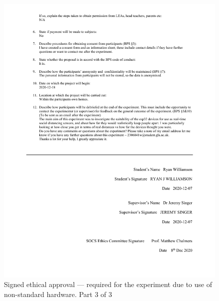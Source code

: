 \documentclass{l4proj}
\begin{document}
\begin{appendices}
    \begin{figure}[!htb]
        \centering
        \includegraphics[width=1.0\linewidth]{images/2306841w-ethics-approval 3.pdf}

        \caption{ Signed ethical approval — required for the experiment due to use of non-standard hardware. Part 3 of 3 }

        \label{fig:full_ethics_approval3}
    \end{figure}


\end{appendices}
\end{document}
